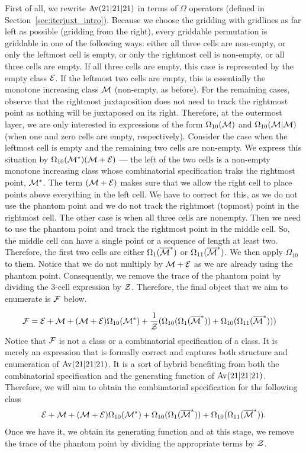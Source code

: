 \documentclass[12pt, a4paper, twoside]{report}
\begin{document}
First of all, we rewrite $\mathrm{Av}(21|21|21)$ in terms of $\Omega$ operators (defined in Section~\ref{sec:iterjuxt_intro}). Because we choose the gridding with gridlines as far left as possible (gridding from the right), every griddable permutation is griddable in one of the following ways: either all three cells are non-empty, or only the leftmost cell is empty, or only the rightmost cell is non-empty, or all three cells are empty. If all three cells are empty, this case is represented by the empty class $\mathcal{E}$. If the leftmost two cells are empty, this is essentially the monotone increasing class $\mathcal{M}$ (non-empty, as before). For the remaining cases, observe that the rightmost juxtaposition does not need to track the rightmost point as nothing will be juxtaposed on its right. Therefore, at the outermost layer, we are only interested in expressions of the form $\Omega_{10}(\mathcal{M})$ and $\Omega_{10}(\mathcal{M}|\mathcal{M})$  (when one and zero cells are empty, respectively). Consider the case when the leftmost cell is empty and the remaining two cells are non-empty. We express this situation by $\Omega_{10}(\mathcal{M}^*)(\mathcal{M}+\mathcal{E})$ --- the left of the two cells is a non-empty monotone increasing class whose combinatorial specification traks the rightmost point, $\mathcal{M}^*$. The term $(\mathcal{M}+\mathcal{E})$ makes sure that we allow the right cell to place points above everything in the left cell. We have to correct for this, as we do not use the phantom point and we do not track the rightmost (topmost) point in the rightmost cell.  The other case is when all three cells are nonempty. Then we need to use the phantom point and track the rightmost point in the middle cell. So, the middle cell can have a single point or a sequence of length at least two. Therefore, the first two cells are either $\Omega_1(\overline{\mathcal{M}}^*)$ or $\Omega_{11}(\overline{\mathcal{M}}^*)$. We then apply $\Omega_{10}$ to them. Notice that we do not multiply by $\mathcal{M}+\mathcal{E}$ as we are already using the phantom point. Consequently, we remove the trace of the phantom point by dividing the 3-cell expression by $\mathcal{Z}$. Therefore, the final object that we aim to enumerate is $\mathcal{F}$ below.


\begin{align}
  \mathcal{F} &= \mathcal{E} + \mathcal{M} + (\mathcal{M}+\mathcal{E})\Omega_{10}(\mathcal{M}^*) +\frac{1}{\mathcal{Z}}(\Omega_{10}(\Omega_1(\overline{\mathcal{M}}^*)) + \Omega_{10}(\Omega_{11}(\overline{\mathcal{M}}^*)))
\label{eq:mmm_final}
\end{align}
Notice that $\mathcal{F}$ is not a class or a combinatorial specification of a class. It is merely an expression that is formally correct and captures both structure and enumeration of $\mathrm{Av}(21|21|21)$. It is a sort of hybrid benefiting from both the combinatorial specification and the generating function of $\mathrm{Av}(21|21|21)$. Therefore, we will aim to obtain the combinatorial specification for the following class
\begin{align}
  \mathcal{E} + \mathcal{M} + (\mathcal{M}+\mathcal{E})\Omega_{10}(\mathcal{M}^*) +\Omega_{10}(\Omega_1(\overline{\mathcal{M}}^*)) + \Omega_{10}(\Omega_{11}(\overline{\mathcal{M}}^*)).
  \label{eq:mmm_combspec}
\end{align}
Once we have it, we obtain its generating function and at this stage, we remove the trace of the phantom point by dividing the appropriate terms by $\mathcal{Z}$.
\end{document}
